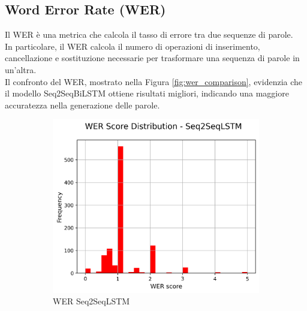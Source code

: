 \documentclass[a4paper, 12pt]{article}
\begin{document}
\subsection{Word Error Rate (WER)}
Il WER è una metrica che calcola il tasso di errore tra due sequenze di parole.\\
In particolare, il WER calcola il numero di operazioni di inserimento, cancellazione e sostituzione necessarie per trasformare una sequenza di parole in un'altra.\\

Il confronto del WER, mostrato nella Figura \ref{fig:wer_comparison}, evidenzia che il modello Seq2SeqBiLSTM ottiene risultati migliori, indicando una maggiore accuratezza nella generazione delle parole.

\begin{figure}[H]
    \centering
    \begin{subfigure}{0.45\textwidth}
        \centering
        \includegraphics[width=\textwidth]{media/Seq2SeqLSTM_wer_scores.png}
        \caption{WER Seq2SeqLSTM}
    \end{subfigure}
    \hfill
    \begin{subfigure}{0.45\textwidth}
        \centering

\end{subfigure}
\end{figure}
\end{document}

